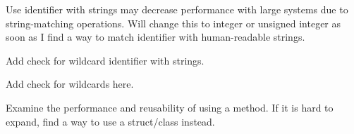 
\begin{DoxyRefList}
\item[\label{todo__todo000001}%
\hypertarget{todo__todo000001}{}%
Member \hyperlink{namespaceDatabase_abca840aa37b2fd02e1d82e32a8171437}{Database\+:\+:Id\+Type} ]Use identifier with strings may decrease performance with large systems due to string-\/matching operations. Will change this to integer or unsigned integer as soon as I find a way to match identifier with human-\/readable strings.  
\item[\label{todo__todo000002}%
\hypertarget{todo__todo000002}{}%
Member \hyperlink{structRules_1_1DataGroupMatch_afe0f2d2d965ead95d330095591b9d830}{Rules\+:\+:Data\+Group\+Match\+:\+:matches\+Node} (const \hyperlink{classDatabase_1_1DataNode}{Database\+::\+Data\+Node} $\ast$node, void $\ast$bindings)]Add check for wildcard identifier with strings. 

Add check for wildcards here.  
\item[\label{todo__todo000004}%
\hypertarget{todo__todo000004}{}%
Member \hyperlink{classRules_1_1Rule_a6fe9b4fa6aaface7ba7f2400d2b27dbc}{Rules\+:\+:Rule\+:\+:action} ()=0]Examine the performance and reusability of using a method. If it is hard to expand, find a way to use a struct/class instead. 
\end{DoxyRefList}